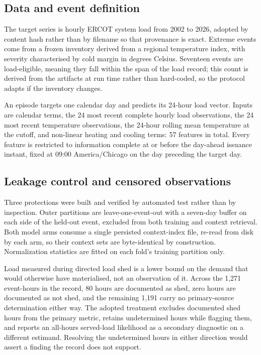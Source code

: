 \documentclass[12pt]{article} %
\begin{document}
\subsection{Data and event definition}

The target series is hourly ERCOT system load from 2002 to 2026, adopted by
content hash rather than by filename so that provenance is exact. Extreme events
come from a frozen inventory derived from a regional temperature index, with
severity characterised by cold margin in degrees Celsius. Seventeen events are
load-eligible, meaning they fall within the span of the load record; this count
is derived from the artifacts at run time rather than hard-coded, so the protocol
adapts if the inventory changes.

An episode targets one calendar day and predicts its 24-hour load vector. Inputs
are calendar terms, the 24 most recent complete hourly load observations, the 24
most recent temperature observations, the 24-hour rolling mean temperature at the
cutoff, and non-linear heating and cooling terms: 57 features in total. Every
feature is restricted to information complete at or before the day-ahead issuance
instant, fixed at 09:00 America/Chicago on the day preceding the target day.

\subsection{Leakage control and censored observations}

Three protections were built and verified by automated test rather than by
inspection. Outer partitions are leave-one-event-out with a seven-day buffer on
each side of the held-out event, excluded from both training and context
retrieval. Both model arms consume a single persisted context-index file, re-read
from disk by each arm, so their context sets are byte-identical by construction.
Normalization statistics are fitted on each fold's training partition only.

Load measured during directed load shed is a lower bound on the demand that would
otherwise have materialised, not an observation of it. Across the 1{,}271
event-hours in the record, 80 hours are documented as shed, zero hours are
documented as not shed, and the remaining 1{,}191 carry no primary-source
determination either way. The adopted treatment excludes documented shed hours
from the primary metric, retains undetermined hours while flagging them, and
reports an all-hours served-load likelihood as a secondary diagnostic on a
different estimand. Resolving the undetermined hours in either direction would
assert a finding the record does not support.
\end{document}

